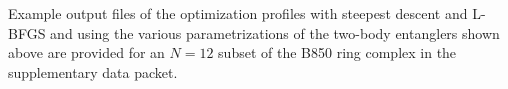 Example output files of the optimization profiles with steepest descent and
L-BFGS and using the various parametrizations of the two-body entanglers shown
above are provided for an $N=12$ subset of the B850 ring complex in the
supplementary data packet.

% 


